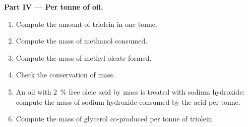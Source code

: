 \begin{problem}
\medskip
\noindent\textbf{Part IV --- Per tonne of oil.}
\begin{enumerate}[resume]
  \item Compute the amount of triolein in one tonne.
  \item Compute the mass of methanol consumed.
  \item Compute the mass of methyl oleate formed.
  \item Check the conservation of mass.
  \item An oil with 2~\% free oleic acid by mass is treated with sodium hydroxide: compute the mass of
        sodium hydroxide consumed by the acid per tonne.
  \item Compute the mass of glycerol co-produced per tonne of triolein.
\end{enumerate}
\end{problem}
